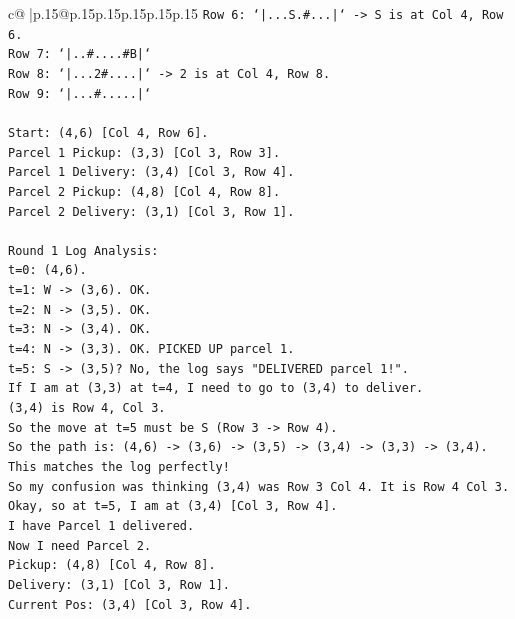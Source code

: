 \documentclass{article}
\begin{document}
{\begin{supertabular}{c@{$\;$}|p{.15\linewidth}@{}p{.15\linewidth}p{.15\linewidth}p{.15\linewidth}p{.15\linewidth}p{.15\linewidth}}
{{{\texttt{Row 6: `|...S.\#...|` {-}> S is at Col 4, Row 6.} \\
\texttt{Row 7: `|..\#....\#B|`} \\
\texttt{Row 8: `|...2\#....|` {-}> 2 is at Col 4, Row 8.} \\
\texttt{Row 9: `|...\#.....|`} \\
\\ 
\texttt{Start: (4,6) {[}Col 4, Row 6{]}.} \\
\texttt{Parcel 1 Pickup: (3,3) {[}Col 3, Row 3{]}.} \\
\texttt{Parcel 1 Delivery: (3,4) {[}Col 3, Row 4{]}.} \\
\texttt{Parcel 2 Pickup: (4,8) {[}Col 4, Row 8{]}.} \\
\texttt{Parcel 2 Delivery: (3,1) {[}Col 3, Row 1{]}.} \\
\\ 
\texttt{Round 1 Log Analysis:} \\
\texttt{t=0: (4,6).} \\
\texttt{t=1: W {-}> (3,6). OK.} \\
\texttt{t=2: N {-}> (3,5). OK.} \\
\texttt{t=3: N {-}> (3,4). OK.} \\
\texttt{t=4: N {-}> (3,3). OK. PICKED UP parcel 1.} \\
\texttt{t=5: S {-}> (3,5)? No, the log says "DELIVERED parcel 1!".} \\
\texttt{If I am at (3,3) at t=4, I need to go to (3,4) to deliver.} \\
\texttt{(3,4) is Row 4, Col 3.} \\
\texttt{So the move at t=5 must be S (Row 3 {-}> Row 4).} \\
\texttt{So the path is: (4,6) {-}> (3,6) {-}> (3,5) {-}> (3,4) {-}> (3,3) {-}> (3,4).} \\
\texttt{This matches the log perfectly!} \\
\texttt{So my confusion was thinking (3,4) was Row 3 Col 4. It is Row 4 Col 3.} \\
\texttt{Okay, so at t=5, I am at (3,4) {[}Col 3, Row 4{]}.} \\
\texttt{I have Parcel 1 delivered.} \\
\texttt{Now I need Parcel 2.} \\
\texttt{Pickup: (4,8) {[}Col 4, Row 8{]}.} \\
\texttt{Delivery: (3,1) {[}Col 3, Row 1{]}.} \\
\texttt{Current Pos: (3,4) {[}Col 3, Row 4{]}.} \\
}}}
\end{supertabular}}
\end{document}
